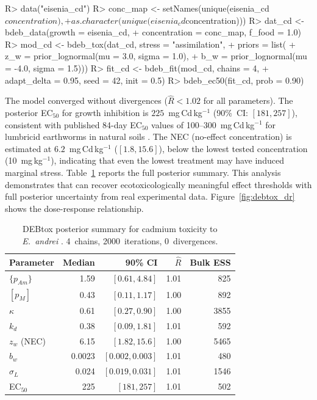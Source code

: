 \documentclass[article,shortnames]{jss}
\newcommand{\pAm}{\{p_{Am}\}}
\newcommand{\pM}{[p_M]}
\begin{document}
\begin{CodeChunk}
\begin{CodeInput}
R> data("eisenia_cd")
R> conc_map <- setNames(unique(eisenia_cd$concentration),
+    as.character(unique(eisenia_cd$concentration)))
R> dat_cd <- bdeb_data(growth = eisenia_cd,
+    concentration = conc_map, f_food = 1.0)
R> mod_cd <- bdeb_tox(dat_cd, stress = "assimilation",
+    priors = list(
+      z_w = prior_lognormal(mu = 3.0, sigma = 1.0),
+      b_w = prior_lognormal(mu = -4.0, sigma = 1.5)))
R> fit_cd <- bdeb_fit(mod_cd, chains = 4,
+    adapt_delta = 0.95, seed = 42, init = 0.5)
R> bdeb_ec50(fit_cd, prob = 0.90)
\end{CodeInput}
\end{CodeChunk}

\noindent
The model converged without divergences ($\hat{R} < 1.02$ for all
parameters).  The posterior EC$_{50}$ for growth inhibition is
$225$~mg\,Cd\,kg$^{-1}$ (90\%~CI: $[181, 257]$), consistent with
published 84-day EC$_{50}$ values of 100--300~mg\,Cd\,kg$^{-1}$ for
lumbricid earthworms in natural soils \citep{VanGestel1991}.  The
NEC (no-effect concentration) is estimated at
$6.2$~mg\,Cd\,kg$^{-1}$ ($[1.8, 15.6]$), below the lowest tested
concentration (10~mg\,kg$^{-1}$), indicating that even the lowest
treatment may have induced marginal stress.  Table~\ref{tab:debtox} reports the full posterior summary.
This analysis demonstrates that  can recover
ecotoxicologically meaningful effect thresholds with full posterior
uncertainty from real experimental data.  Figure~\ref{fig:debtox_dr}
shows the dose-response relationship.

\begin{table}[t!]
\centering
\caption{DEBtox posterior summary for cadmium toxicity to
  \emph{E.~andrei} \citep{VanGestel1991}.  4~chains, 2000~iterations,
  0~divergences.}
\label{tab:debtox}
\begin{tabular}{lrrrr}
\toprule
Parameter & Median & 90\% CI & $\hat{R}$ & Bulk ESS \\
\midrule
$\pAm$     & 1.59  & $[0.61, 4.84]$    & 1.01 & 825 \\
$\pM$      & 0.43  & $[0.11, 1.17]$    & 1.00 & 892 \\
$\kappa$   & 0.61  & $[0.27, 0.90]$    & 1.00 & 3855 \\
$k_d$      & 0.38  & $[0.09, 1.81]$    & 1.01 & 592 \\
$z_w$ (NEC) & 6.15 & $[1.82, 15.6]$    & 1.00 & 5465 \\
$b_w$      & 0.0023 & $[0.002, 0.003]$ & 1.01 & 480 \\
$\sigma_L$ & 0.024 & $[0.019, 0.031]$  & 1.01 & 1546 \\
EC$_{50}$  & 225   & $[181, 257]$       & 1.01 & 502 \\
\bottomrule
\end{tabular}
\end{table}
\end{document}
